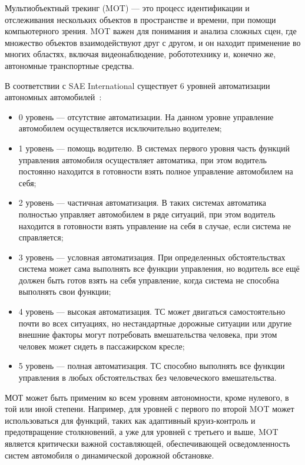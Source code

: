 Мультиобъектный трекинг (MOT) — это процесс идентификации и отслеживания нескольких объектов в пространстве и времени, при помощи компьютерного зрения. MOT важен для понимания и анализа сложных сцен, где множество объектов взаимодействуют друг с другом, и он находит применение во многих областях, включая видеонаблюдение, робототехнику и, конечно же, автономные транспортные средства.

В соответствии с SAE International существует 6 уровней автоматизации автономных автомобилей~\cite{Yang2011}:

\begin{itemize}

	\item 	0 уровень --- отсутствие автоматизации. На данном уровне управление автомобилем осуществляется исключительно водителем;

	\item 	1 уровень --- помощь водителю. В системах первого уровня часть функций управления автомобиля осуществляет автоматика, при этом водитель постоянно находится в готовности взять полное управление автомобилем на себя;
	
	\item	2 уровень --- частичная автоматизация. В таких системах автоматика полностью управляет автомобилем в ряде ситуаций, при этом водитель находится в готовности взять управление на себя в случае, если система не справляется;
	
	\item	3 уровень --- условная автоматизация. При определенных обстоятельствах система может сама выполнять все функции управления, но водитель все ещё должен быть готов взять на себя управление, когда система не способна выполнять свои функции;
	
	\item 	4 уровень --- высокая автоматизация. ТС может двигаться самостоятельно почти во всех ситуациях, но нестандартные дорожные ситуации или другие внешние факторы могут потребовать вмешательства человека, при этом человек может сидеть в пассажирском кресле;
	
	\item 	5 уровень --- полная автоматизация. ТС способно выполнять все функции управления в любых обстоятельствах без человеческого вмешательства.

\end{itemize}

МОТ может быть применим ко всем уровням автономности, кроме нулевого, в той или иной степени. Например, для уровней с первого по второй MOT может использоваться для функций, таких как адаптивный круиз-контроль и предотвращение столкновений, а уже для уровней с третьего и выше, MOT является критически важной составляющей, обеспечивающей осведомленность систем автомобиля о динамической дорожной обстановке.


